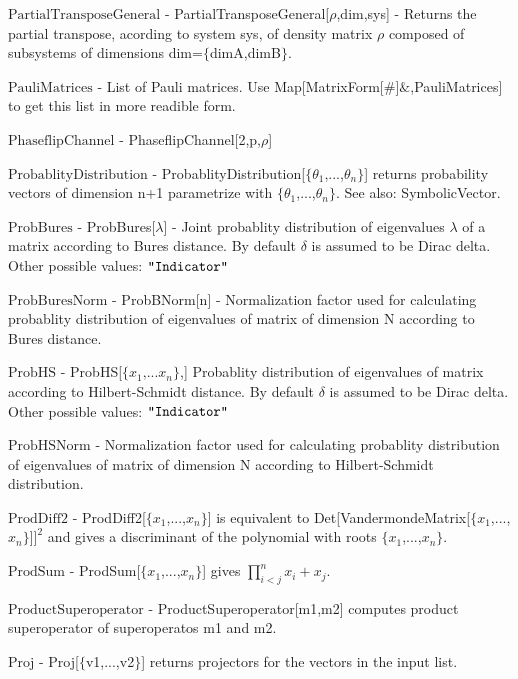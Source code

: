 \documentclass[a4paper,12pt]{article}
\begin{document}
\textbf{$ \text{PartialTransposeGeneral} $ } - PartialTransposeGeneral[$\rho $,dim,sys] - Returns the partial transpose, acording to system sys, of density matrix $\rho $ composed of subsystems of dimensions dim=$\{$dimA,dimB$\}$. $  $

\textbf{$ \text{PauliMatrices} $ } - List of Pauli matrices. Use Map[MatrixForm[$\#$]$\&$,PauliMatrices] to get this list in more readible form.$  $

\textbf{$ \text{PhaseflipChannel} $ } - PhaseflipChannel[2,p,$\rho $]$  $

\textbf{$ \text{ProbablityDistribution} $ } - ProbablityDistribution[$\{$$ \theta _1 $,...,$ \theta _n $$\}$] returns probability vectors of dimension n+1 parametrize with $\{$$ \theta _1 $,...,$ \theta _n $$\}$. See also: SymbolicVector.$  $

\textbf{$ \text{ProbBures} $ } - ProbBures[$\lambda $] - Joint probablity distribution of eigenvalues $\lambda $ of a matrix according to Bures distance. By default $\delta $ is assumed to be Dirac delta. Other possible values: $\texttt{"$ $Indicator$\texttt{"}$} $

\textbf{$ \text{ProbBuresNorm} $ } - ProbBNorm[n] - Normalization factor used for calculating probablity distribution of eigenvalues of matrix of dimension N according to Bures distance.$  $

\textbf{$ \text{ProbHS} $ } - ProbHS[$\{$$ x_1\text{,...}x_n $$\}$,] Probablity distribution of eigenvalues of matrix according to Hilbert-Schmidt distance. By default $\delta $ is assumed to be Dirac delta. Other possible values: $\texttt{"$ $Indicator$\texttt{"}$} $

\textbf{$ \text{ProbHSNorm} $ } - Normalization factor used for calculating probablity distribution of eigenvalues of matrix of dimension N according to Hilbert-Schmidt distribution.$  $

\textbf{$ \text{ProdDiff2} $ } - ProdDiff2[$\{$$ x_1 $,...,$ x_n $$\}$] is equivalent to Det[VandermondeMatrix[$\{$$ x_1 $,...,$ x_n $$\}$]$ ]^2 $ and gives a discriminant of the polynomial with roots $\{$$ x_1 $,...,$ x_n $$\}$.$  $

\textbf{$ \text{ProdSum} $ } - ProdSum[$\{$$ x_1 $,...,$ x_n $$\}$] gives $ \prod _{i<j}^nx_i+x_j. $

\textbf{$ \text{ProductSuperoperator} $ } - ProductSuperoperator[m1,m2] computes product superoperator of superoperatos m1 and m2.$  $

\textbf{$ \text{Proj} $ } - Proj[$\{$v1,...,v2$\}$] returns projectors for the vectors in the input list.$  $
\end{document}
